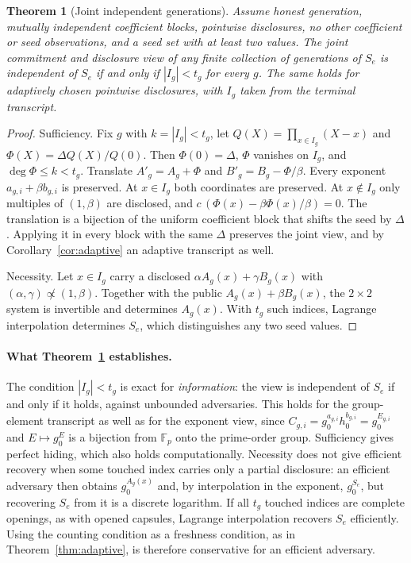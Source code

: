 \documentclass[pdflatex,sn-mathphys-num]{sn-jnl}%
\theoremstyle{plain}
\newtheorem{theorem}{Theorem}
\theoremstyle{definition}
\newcommand{\F}{\mathbb{F}}
\begin{document}
\begin{keyresult}
\begin{theorem}[Joint independent generations]\label{thm:generations}
Assume honest generation, mutually independent coefficient blocks, pointwise disclosures, no other coefficient or seed observations, and a seed set with at least two values. The joint commitment and disclosure view of any finite collection of generations of $S_e$ is independent of $S_e$ if and only if $|I_g|<t_g$ for every $g$. The same holds for adaptively chosen pointwise disclosures, with $I_g$ taken from the terminal transcript.
\end{theorem}
\end{keyresult}
\begin{proof}
Sufficiency. Fix $g$ with $k=|I_g|<t_g$, let $Q(X)=\prod_{x\in I_g}(X-x)$ and $\Phi(X)=\Delta Q(X)/Q(0)$. Then $\Phi(0)=\Delta$, $\Phi$ vanishes on $I_g$, and $\deg\Phi\le k<t_g$. Translate $A'_g=A_g+\Phi$ and $B'_g=B_g-\Phi/\beta$. Every exponent $a_{g,i}+\beta b_{g,i}$ is preserved. At $x\in I_g$ both coordinates are preserved. At $x\notin I_g$ only multiples of $(1,\beta)$ are disclosed, and $c\,(\Phi(x)-\beta\Phi(x)/\beta)=0$. The translation is a bijection of the uniform coefficient block that shifts the seed by $\Delta$. Applying it in every block with the same $\Delta$ preserves the joint view, and by Corollary~\ref{cor:adaptive} an adaptive transcript as well.

Necessity. Let $x\in I_g$ carry a disclosed $\alpha A_g(x)+\gamma B_g(x)$ with $(\alpha,\gamma)\not\propto(1,\beta)$. Together with the public $A_g(x)+\beta B_g(x)$, the $2\times2$ system is invertible and determines $A_g(x)$. With $t_g$ such indices, Lagrange interpolation determines $S_e$, which distinguishes any two seed values.
\end{proof}

\paragraph{What Theorem~\ref{thm:generations} establishes.}
The condition $|I_g|<t_g$ is exact for \emph{information}: the view is independent of $S_e$ if and only if it holds, against unbounded adversaries. This holds for the group-element transcript as well as for the exponent view, since $C_{g,i}=g_0^{a_{g,i}}h_0^{b_{g,i}}=g_0^{E_{g,i}}$ and $E\mapsto g_0^E$ is a bijection from $\F_p$ onto the prime-order group. Sufficiency gives perfect hiding, which also holds computationally. Necessity does not give efficient recovery when some touched index carries only a partial disclosure: an efficient adversary then obtains $g_0^{A_g(x)}$ and, by interpolation in the exponent, $g_0^{S_e}$, but recovering $S_e$ from it is a discrete logarithm. If all $t_g$ touched indices are complete openings, as with opened capsules, Lagrange interpolation recovers $S_e$ efficiently. Using the counting condition as a freshness condition, as in Theorem~\ref{thm:adaptive}, is therefore conservative for an efficient adversary.
\end{document}

